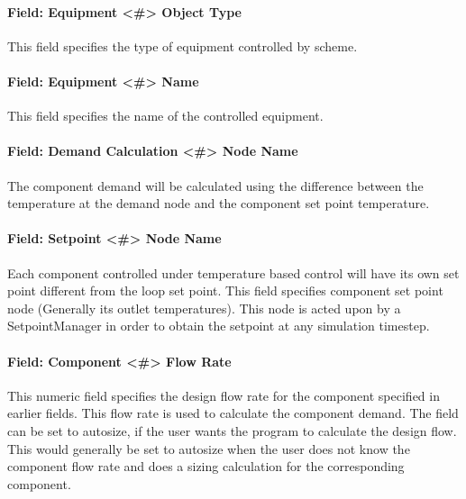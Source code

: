 \paragraph{Field: Equipment \textless{}\#\textgreater{} Object Type}\label{field-equipment-object-type}

This field specifies the type of equipment controlled by scheme.

\paragraph{Field: Equipment \textless{}\#\textgreater{} Name}\label{field-equipment-name}

This field specifies the name of the controlled equipment.

\paragraph{Field: Demand Calculation \textless{}\#\textgreater{} Node Name}\label{field-demand-calculation-node-name}

The component demand will be calculated using the difference between the temperature at the demand node and the component set point temperature.

\paragraph{Field: Setpoint \textless{}\#\textgreater{} Node Name}\label{field-setpoint-node-name}

Each component controlled under temperature based control will have its own set point different from the loop set point. This field specifies component set point node (Generally its outlet temperatures). This node is acted upon by a SetpointManager in order to obtain the setpoint at any simulation timestep.

\paragraph{Field: Component \textless{}\#\textgreater{} Flow Rate}\label{field-component-flow-rate}

This numeric field specifies the design flow rate for the component specified in earlier fields. This flow rate is used to calculate the component demand. The field can be set to autosize, if the user wants the program to calculate the design flow. This would generally be set to autosize when the user does not know the component flow rate and does a sizing calculation for the corresponding component.

